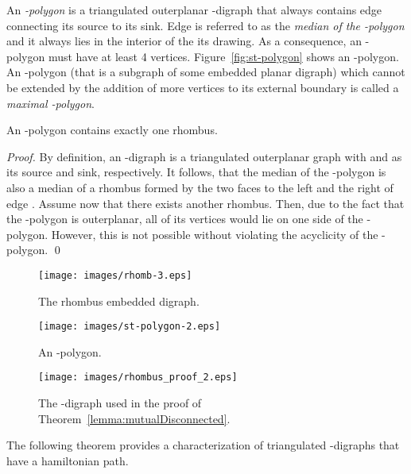 \documentclass{myllncs-mixalis}
\begin{document}
 An \emph{-polygon} is a triangulated
outerplanar -digraph that always contains edge 
connecting its source to its sink. Edge  is referred to as
the \emph{median of the -polygon} and it always lies in the
interior of the its drawing. As a consequence, an -polygon must
have at least 4 vertices. Figure~\ref{fig:st-polygon} shows an
-polygon. An -polygon (that is a subgraph of some embedded
planar digraph) which cannot be extended by the addition of more
vertices to its external boundary is called a \emph{maximal
-polygon}.

\begin{lemma}
\label{lemma:oneRombus} An -polygon contains exactly one
rhombus.
\end{lemma}
\begin{proof}
By   definition, an -digraph is a triangulated outerplanar graph
with  and  as its source and sink, respectively. It follows,
that the median of the -polygon is also a median of a rhombus
formed by the two faces to the left and the right of edge .
Assume now that there exists another rhombus. Then, due to the fact
that the -polygon is outerplanar, all of its vertices would lie
on one side of the -polygon. However, this is not possible
without violating the acyclicity of the -polygon.
 \qed
\end{proof}

\begin{figure}[htb]
    \begin{minipage}{0.32\textwidth}
    \centering
    \texttt{[image: images/rhomb-3.eps]}
    \caption{The rhombus embedded digraph.}
    \label{fig:rhombus}
  \end{minipage}
\hfill
    \begin{minipage}{0.32\textwidth}
    \centering
    \texttt{[image: images/st-polygon-2.eps]}
    \caption{An -polygon.}
    \label{fig:st-polygon}
  \end{minipage}
\hfill
    \begin{minipage}{0.32\textwidth}
    \centering
    \texttt{[image: images/rhombus\_proof\_2.eps]}
    \caption{The -digraph used in the proof of Theorem~\ref{lemma:mutualDisconnected}.}
    \label{fig:rhombusProof}
  \end{minipage}
\end{figure}



 The following theorem provides a characterization of
triangulated -digraphs that have a hamiltonian path.
\end{document}
